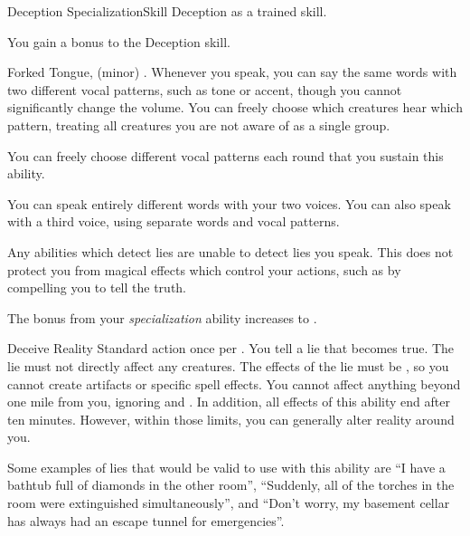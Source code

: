   \begin{feat}{Deception Specialization}{Skill}
    \featpre Deception as a trained skill.

     You gain a  bonus to the Deception skill.

    \begin{sustainability}{Forked Tongue}{,  (minor)}
      \abilityusagetime {}.
      \rankline
      Whenever you speak, you can say the same words with two different vocal patterns, such as tone or accent, though you cannot significantly change the volume.
      You can freely choose which creatures hear which pattern, treating all creatures you are not aware of as a single group.

      You can freely choose different vocal patterns each round that you sustain this ability.

      \rankline
       You can speak entirely different words with your two voices.
       You can also speak with a third voice, using separate words and vocal patterns.
    \end{sustainability}

     Any \magical abilities which detect lies are unable to detect lies you speak.
    This does not protect you from magical effects which control your actions, such as by compelling you to tell the truth.

     The bonus from your \textit{specialization} ability increases to .

    \begin{magicalactiveability}{Deceive Reality}
      \abilityusagetime Standard action once per .
      \rankline
      You tell a lie that becomes true.
      The lie must not directly affect any creatures.
      The effects of the lie must be , so you cannot create artifacts or specific spell effects.
      You cannot affect anything beyond one mile from you, ignoring  and .
      In addition, all effects of this ability end after ten minutes.
      However, within those limits, you can generally alter reality around you.

      Some examples of lies that would be valid to use with this ability are ``I have a bathtub full of diamonds in the other room'', ``Suddenly, all of the torches in the room were extinguished simultaneously'', and ``Don't worry, my basement cellar has always had an escape tunnel for emergencies''.
    \end{magicalactiveability}
  \end{feat}

